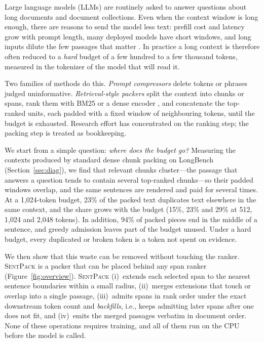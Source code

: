 \documentclass[11pt]{article}
\newcommand{\spk}{\textsc{SentPack}}
\begin{document}
Large language models (LLMs) are routinely asked to answer questions about long documents and document collections. Even when the context window is long enough, there are reasons to send the model less text: prefill cost and latency grow with prompt length, many deployed models have short windows, and long inputs dilute the few passages that matter \citep{liu2024lost}. In practice a long context is therefore often reduced to a \emph{hard} budget of a few hundred to a few thousand tokens, measured in the tokenizer of the model that will read it.

Two families of methods do this. \emph{Prompt compressors} \citep{li2023selectivecontext,jiang2023llmlingua,jiang2024longllmlingua,pan2024llmlingua2} delete tokens or phrases judged uninformative. \emph{Retrieval-style packers} split the context into chunks or spans, rank them with BM25 or a dense encoder \citep{robertson2009probabilistic,karpukhin2020dense,xiao2023cpack}, and concatenate the top-ranked units, each padded with a fixed window of neighbouring tokens, until the budget is exhausted. Research effort has concentrated on the ranking step; the packing step is treated as bookkeeping.

We start from a simple question: \emph{where does the budget go?} Measuring the contexts produced by standard dense chunk packing on LongBench (Section~\ref{sec:diag}), we find that relevant chunks cluster---the passage that answers a question tends to contain several top-ranked chunks---so their padded windows overlap, and the same sentences are rendered and paid for several times. At a 1,024-token budget, 23\% of the packed text duplicates text elsewhere in the same context, and the share grows with the budget (15\%, 23\% and 29\% at 512, 1,024 and 2,048 tokens). In addition, 94\% of packed pieces end in the middle of a sentence, and greedy admission leaves part of the budget unused. Under a hard budget, every duplicated or broken token is a token not spent on evidence.

We then show that this waste can be removed without touching the ranker. \spk{} is a packer that can be placed behind any span ranker (Figure~\ref{fig:overview}). \spk{} (i)~extends each selected span to the nearest sentence boundaries within a small radius, (ii)~merges extensions that touch or overlap into a single passage, (iii)~admits spans in rank order under the exact downstream token count and \emph{backfills}, i.e., keeps admitting later spans after one does not fit, and (iv)~emits the merged passages verbatim in document order. None of these operations requires training, and all of them run on the CPU before the model is called.
\end{document}
